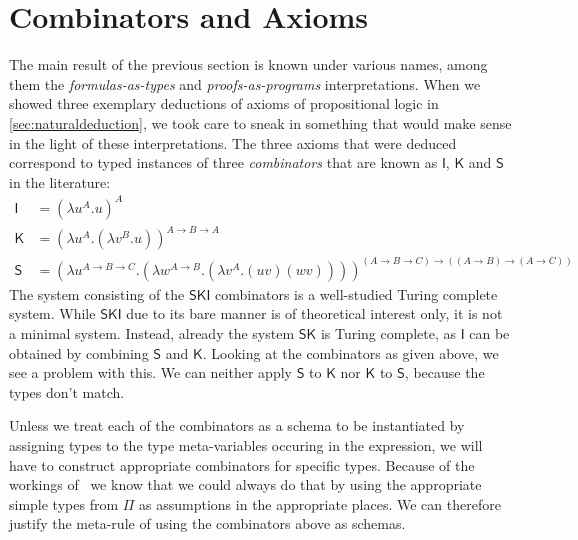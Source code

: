 \section{Combinators and Axioms}

The main result of the previous section is known under various names, among them
the \textit{formulas-as-types} and \textit{proofs-as-programs} interpretations.
When we showed three exemplary deductions of axioms of propositional logic in
\ref{sec:naturaldeduction}, we took care to sneak in something that would make
sense in the light of these interpretations. The three axioms that were deduced
correspond to typed instances of three \textit{combinators} that are known as
$\mathsf{I}$, $\mathsf{K}$ and $\mathsf{S}$ in the literature:
\begin{align*}
\mathsf{I} &=
  (\lambda u^A.u)^A \\
\mathsf{K} &=
  (\lambda u^A.
     (\lambda v^B.u)
  )^{A \to B \to A} \\
\mathsf{S} &=
  (\lambda u^{A \to B \to C}.
     (\lambda w^{A \to B}.
       (\lambda v^A.(uv)(wv))
     )
  )^{(A \to B \to C) \to ((A \to B) \to (A \to C))}
\end{align*}
The system consisting of the $\mathsf{SKI}$ combinators is a well-studied Turing
complete system. While $\mathsf{SKI}$ due to its bare manner is of theoretical
interest only, it is not a minimal system. Instead, already the system
$\mathsf{SK}$ is Turing complete, as $\mathsf{I}$ can be obtained by combining
$\mathsf{S}$ and $\mathsf{K}$. Looking at the combinators as given above, we see
a problem with this. We can neither apply $\mathsf{S}$ to $\mathsf{K}$ nor
$\mathsf{K}$ to $\mathsf{S}$, because the types don't match.

Unless we treat each of the combinators as a schema to be instantiated by
assigning types to the type meta-variables occuring in the expression, we will
have to construct appropriate combinators for specific types. Because of the
workings of \implnpi\ we know that we could always do that by using the
appropriate simple types from $\Pi$ as assumptions in the appropriate places. We
can therefore justify the meta-rule of using the combinators above as schemas.

